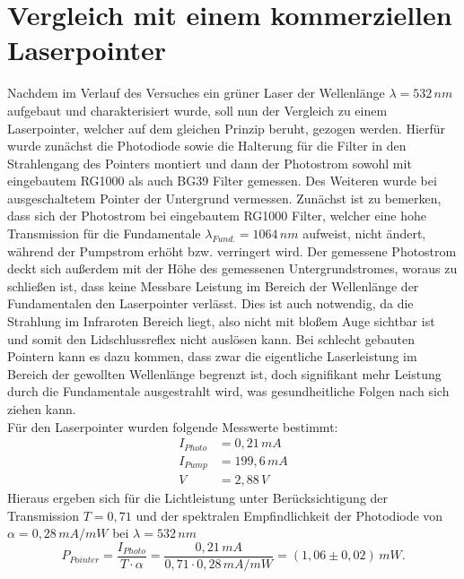 \documentclass[twoside,colorback,accentcolor=tud4c,11pt]{tudreport}
\begin{document}
\section{Vergleich mit einem kommerziellen Laserpointer}
Nachdem im Verlauf des Versuches ein grüner Laser der Wellenlänge $\lambda =532\,\si{nm}$ aufgebaut und charakterisiert wurde, soll nun der Vergleich zu einem Laserpointer, welcher auf dem gleichen Prinzip beruht, gezogen werden. Hierfür wurde zunächst die Photodiode sowie die Halterung für die Filter in den Strahlengang des Pointers montiert und dann der Photostrom sowohl mit eingebautem RG1000 als auch BG39 Filter gemessen. Des Weiteren wurde bei ausgeschaltetem Pointer der Untergrund vermessen.
Zunächst ist zu bemerken, dass sich der Photostrom bei eingebautem RG1000 Filter, welcher eine hohe Transmission für die Fundamentale $\lambda_{Fund.}=1064\,\si{nm}$ aufweist, nicht ändert, während der Pumpstrom erhöht bzw. verringert wird. Der gemessene Photostrom deckt sich außerdem mit der Höhe des gemessenen Untergrundstromes, woraus zu schließen ist, dass keine Messbare Leistung im Bereich der Wellenlänge der Fundamentalen den Laserpointer verlässt. Dies ist auch notwendig, da die Strahlung im Infraroten Bereich liegt, also nicht mit bloßem Auge sichtbar ist und somit den Lidschlussreflex nicht auslösen kann. Bei schlecht gebauten Pointern kann es dazu kommen, dass zwar die eigentliche Laserleistung im Bereich der gewollten Wellenlänge begrenzt ist, doch signifikant mehr Leistung durch die Fundamentale ausgestrahlt wird, was gesundheitliche Folgen nach sich ziehen kann.\\
Für den Laserpointer wurden folgende Messwerte bestimmt:
\begin{align}
I_{Photo}&=0,21\,\si{mA}\\
I_{Pump}&=199,6\,\si{mA}\\
V&=2,88\,\si{V}
\end{align}
Hieraus ergeben sich für die Lichtleistung unter Berücksichtigung der Transmission $T=0,71$ und der spektralen Empfindlichkeit der Photodiode von $\alpha =0,28\,\si{mA/mW}$ bei $\lambda =532\,\si{nm}$ 
\begin{equation}
P_{Pointer}=\frac{I_{Photo}}{T\cdot\alpha}=\frac{0,21\,\si{mA}}{0,71\cdot 0,28\,\si{mA/mW}}=(1,06\pm 0,02) \,\si{mW}.
\end{equation}
\end{document}
